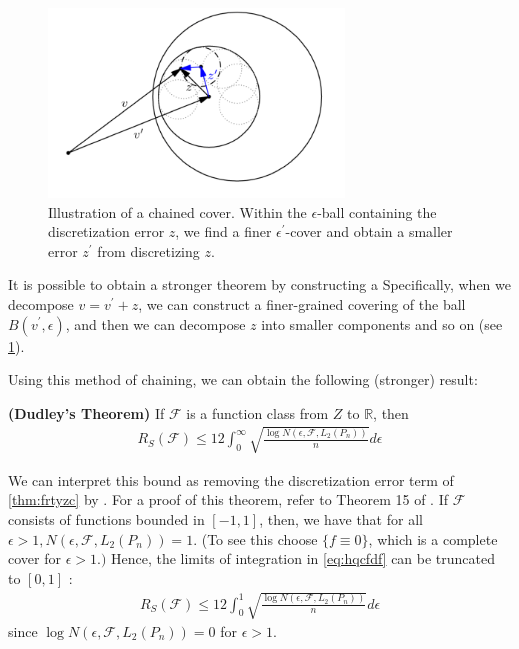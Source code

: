\documentclass{article}
\newcommand{\bfs}[1]{\textbf{({#1}) }}
\begin{document}
\begin{figure}[H]
    \centering
    \includegraphics[width=0.7\textwidth]{Figs/4.png}
    \caption{Illustration of a chained cover. Within the $\epsilon$-ball containing the discretization error $z$, we find a finer $\epsilon^{\prime}$-cover and obtain a smaller error $z^{\prime}$ from discretizing $z$.}
    \label{fig:chain}
\end{figure}
It is possible to obtain a stronger theorem by constructing a  Specifically, when we decompose $v=v^{\prime}+z$, we can construct a finer-grained covering of the ball $B\left(v^{\prime}, \epsilon\right)$, and then we can decompose $z$ into smaller components and so on (see \cref{fig:chain}). 


Using this method of chaining, we can obtain the following (stronger) result:
\begin{thma}\bfs{Dudley's Theorem}\label{thm:Dudley's Theorem}
 If $\mathcal{F}$ is a function class from $Z$ to $\mathbb{R}$, then
\begin{align}
R_{S}(\mathcal{F}) \leq 12 \int_{0}^{\infty} \sqrt{\frac{\log N\left(\epsilon, \mathcal{F}, L_{2}\left(P_{n}\right)\right)}{n}} d \epsilon\label{eq:hqcfdf}
\end{align}
\end{thma}
\begin{rema}
We can interpret this bound as removing the discretization error term of \cref{thm:frtyzc} by . For a proof of this theorem, refer to Theorem 15 of \cite{Liang}.
If $\mathcal{F}$ consists of functions bounded in $[-1,1]$, then, we have that for all $\epsilon>1, N\left(\epsilon, \mathcal{F}, L_{2}\left(P_{n}\right)\right)=1$. (To see this choose $\{f \equiv 0\}$, which is a complete cover for $\epsilon>1 .)$ Hence, the limits of integration in \cref{eq:hqcfdf} can be truncated to $[0,1]$ :
\begin{align*}
R_{S}(\mathcal{F}) \leq 12 \int_{0}^{1} \sqrt{\frac{\log N\left(\epsilon, \mathcal{F}, L_{2}\left(P_{n}\right)\right)}{n}} d \epsilon
\end{align*}
since $\log N\left(\epsilon, \mathcal{F}, L_{2}\left(P_{n}\right)\right)=0$ for $\epsilon>1$.
\end{rema}
\end{document}
